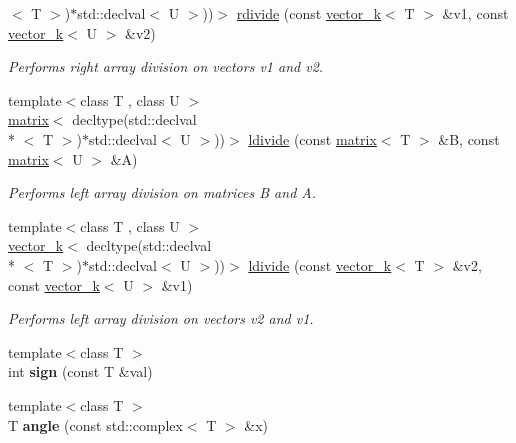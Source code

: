\begin{DoxyCompactItemize}
$<$ T $>$)$\ast$std\-::declval$<$ U $>$))$>$ \hyperlink{namespacekeycpp_ab299ba9f0640c2f95fe2393f2eef6ed2}{rdivide} (const \hyperlink{classkeycpp_1_1vector__k}{vector\-\_\-k}$<$ T $>$ \&v1, const \hyperlink{classkeycpp_1_1vector__k}{vector\-\_\-k}$<$ U $>$ \&v2)
\begin{DoxyCompactList}\small\item\em Performs right array division on vectors v1 and v2. \end{DoxyCompactList}\item 
{\footnotesize template$<$class T , class U $>$ }\\\hyperlink{classkeycpp_1_1matrix}{matrix}$<$ decltype(std\-::declval\\*
$<$ T $>$)$\ast$std\-::declval$<$ U $>$))$>$ \hyperlink{namespacekeycpp_ac57d32902cba2c399475015235aeccec}{ldivide} (const \hyperlink{classkeycpp_1_1matrix}{matrix}$<$ T $>$ \&B, const \hyperlink{classkeycpp_1_1matrix}{matrix}$<$ U $>$ \&A)
\begin{DoxyCompactList}\small\item\em Performs left array division on matrices B and A. \end{DoxyCompactList}\item 
{\footnotesize template$<$class T , class U $>$ }\\\hyperlink{classkeycpp_1_1vector__k}{vector\-\_\-k}$<$ decltype(std\-::declval\\*
$<$ T $>$)$\ast$std\-::declval$<$ U $>$))$>$ \hyperlink{namespacekeycpp_acee6d21e4a11f11422cc5f47d37c0e72}{ldivide} (const \hyperlink{classkeycpp_1_1vector__k}{vector\-\_\-k}$<$ T $>$ \&v2, const \hyperlink{classkeycpp_1_1vector__k}{vector\-\_\-k}$<$ U $>$ \&v1)
\begin{DoxyCompactList}\small\item\em Performs left array division on vectors v2 and v1. \end{DoxyCompactList}\item 
\hypertarget{namespacekeycpp_a87f2917e6a7c8e20d010aea0d8480668}{{\footnotesize template$<$class T $>$ }\\int {\bfseries sign} (const T \&val)}\label{namespacekeycpp_a87f2917e6a7c8e20d010aea0d8480668}

\item 
\hypertarget{namespacekeycpp_aaa2e17334911e8a447a5ef6c0cc54c3f}{{\footnotesize template$<$class T $>$ }\\T {\bfseries angle} (const std\-::complex$<$ T $>$ \&x)}\label{namespacekeycpp_aaa2e17334911e8a447a5ef6c0cc54c3f}


\end{DoxyCompactItemize}
